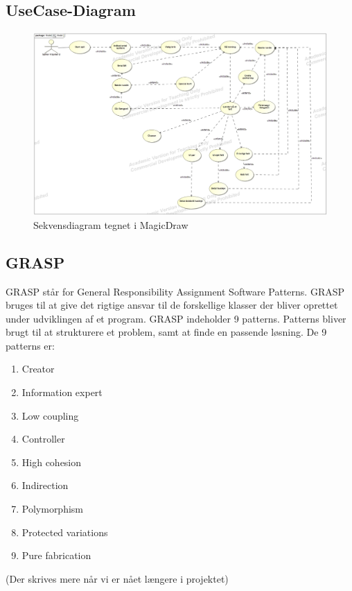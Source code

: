 \subsection{UseCase-Diagram}
    \begin{figure}[h]
        \advance\leftskip-3cm
        \includegraphics[width=20cm]{fig/UC-cdio3.jpg}
        \caption{Sekvensdiagram tegnet i MagicDraw}
    \end{figure}
\subsection{GRASP}
    GRASP står for General Responsibility Assignment Software Patterns. GRASP bruges til at give det rigtige ansvar til de forskellige klasser der bliver oprettet under udviklingen af et program. GRASP indeholder 9 patterns. Patterns bliver brugt til at strukturere et problem, samt at finde en passende løsning. De 9 patterns er:
    \begin{enumerate}
        \item Creator
        \item Information expert
        \item Low coupling
        \item Controller
        \item High cohesion
        \item Indirection
        \item Polymorphism
        \item Protected variations
        \item Pure fabrication
    \end{enumerate}
    (Der skrives mere når vi er nået længere i projektet)
